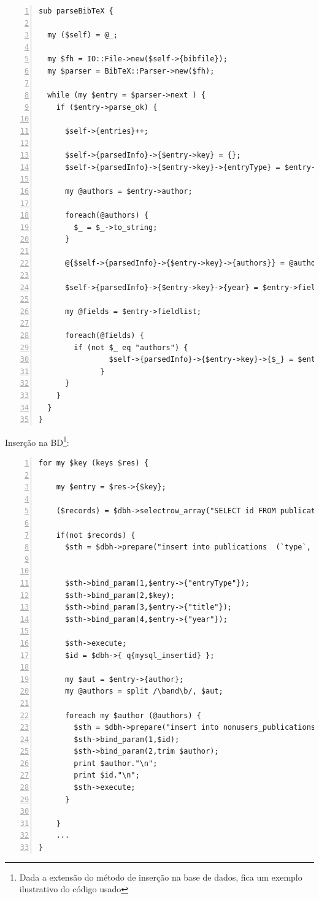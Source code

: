 \documentclass[a4paper,11pt,openright,openbib]{article}
\begin{document}
\lstset{language=Perl}
\lstset{basicstyle=\ttfamily\footnotesize}
\lstset{commentstyle=\textit}
\lstset{breaklines=true}
\begin{lstlisting}[numbers=left]
sub parseBibTeX {

  my ($self) = @_;

  my $fh = IO::File->new($self->{bibfile});
  my $parser = BibTeX::Parser->new($fh);

  while (my $entry = $parser->next ) {
    if ($entry->parse_ok) {
      
      $self->{entries}++;
      
      $self->{parsedInfo}->{$entry->key} = {};
      $self->{parsedInfo}->{$entry->key}->{entryType} = $entry->type;
      
      my @authors = $entry->author;     

      foreach(@authors) {
        $_ = $_->to_string;       
      }
            
      @{$self->{parsedInfo}->{$entry->key}->{authors}} = @authors;
      
      $self->{parsedInfo}->{$entry->key}->{year} = $entry->field("year");

      my @fields = $entry->fieldlist;

      foreach(@fields) {
        if (not $_ eq "authors") {
                $self->{parsedInfo}->{$entry->key}->{$_} = $entry->field($_);
              }
      }
    }
  }
}
\end{lstlisting}
Inserção na BD\footnote{Dada a extensão do método de inserção na base de dados, fica um exemplo ilustrativo do código usado}:\\
\lstset{language=Perl}
\lstset{basicstyle=\ttfamily\footnotesize}
\lstset{commentstyle=\textit}
\lstset{breaklines=true}
\begin{lstlisting}[numbers=left]
for my $key (keys $res) {
    
    my $entry = $res->{$key};

    ($records) = $dbh->selectrow_array("SELECT id FROM publications as p where p.key=\'$key\';");

    if(not $records) {
      $sth = $dbh->prepare("insert into publications  (`type`, `key`, `title`, `year`) values (?,?,?,?)");
      
      
      $sth->bind_param(1,$entry->{"entryType"});
      $sth->bind_param(2,$key);
      $sth->bind_param(3,$entry->{"title"});
      $sth->bind_param(4,$entry->{"year"});

      $sth->execute;
      $id = $dbh->{ q{mysql_insertid} };

      my $aut = $entry->{author};     
      my @authors = split /\band\b/, $aut;          
      
      foreach my $author (@authors) {
        $sth = $dbh->prepare("insert into nonusers_publications (`publications_id`, `name`) values (?,?)");   
        $sth->bind_param(1,$id);
        $sth->bind_param(2,trim $author);
        print $author."\n";
        print $id."\n";
        $sth->execute;
      }

    }
    ...
}
\end{lstlisting}
  
\end{document}
